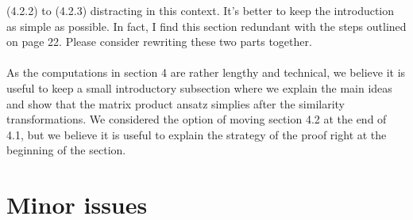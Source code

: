 \documentclass[10pt]{article}
\numberwithin{equation}{section}
\numberwithin{equation}{subsection}
\begin{document}
\begin{enumerate}
{							(4.2.2) to (4.2.3) distracting in this context. It’s better to keep the introduction as simple as possible.
							In fact, I find this section redundant with the steps outlined on page 22. Please consider rewriting
							these two parts together.}\\ \\ 	As the computations in section 4 are rather lengthy and technical, we believe it is useful to keep a small introductory subsection where we explain the main ideas and show that the matrix product ansatz simplies after the similarity transformations.
							We considered the option of moving section 4.2 at the end of 4.1, but we believe it is useful to explain the strategy of the proof right at the beginning of the section.							
		\end{enumerate}
		\section*{Minor issues}
\end{document}
